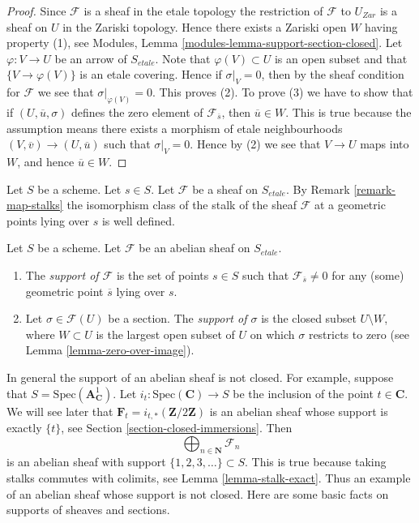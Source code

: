 \begin{proof}
Since $\mathcal{F}$ is a sheaf in the etale topology the restriction of
$\mathcal{F}$ to $U_{Zar}$ is a sheaf on $U$ in the Zariski topology.
Hence there exists a Zariski open $W$ having property (1), see
Modules, Lemma \ref{modules-lemma-support-section-closed}. Let
$\varphi : V \to U$ be an arrow of $S_{etale}$. Note that
$\varphi(V) \subset U$ is an open subset and that
$\{V \to \varphi(V)\}$ is an etale covering. Hence if
$\sigma|_V = 0$, then by the sheaf condition for $\mathcal{F}$ we
see that $\sigma|_{\varphi(V)} = 0$. This proves (2).
To prove (3) we have to show that if $(U, \overline{u}, \sigma)$
defines the zero element of $\mathcal{F}_{\overline{s}}$, then
$\overline{u} \in W$. This is true because the assumption means
there exists a morphism of etale neighbourhoods
$(V, \overline{v}) \to (U, \overline{u})$ such that
$\sigma|_V = 0$. Hence by (2) we see that $V \to U$ maps into $W$, and
hence $\overline{u} \in W$.
\end{proof}

\noindent
Let $S$ be a scheme. Let $s \in S$.
Let $\mathcal{F}$ be a sheaf on $S_{etale}$. By
Remark \ref{remark-map-stalks}
the isomorphism class of the stalk of the sheaf $\mathcal{F}$
at a geometric points lying over $s$ is well defined.

\begin{definition}
\label{definition-support}
Let $S$ be a scheme. Let $\mathcal{F}$ be an abelian sheaf on $S_{etale}$.
\begin{enumerate}
\item The {\it support of $\mathcal{F}$} is the set of
points $s \in S$ such that $\mathcal{F}_{\overline{s}} \not = 0$
for any (some) geometric point $\overline{s}$ lying over $s$.
\item Let $\sigma \in \mathcal{F}(U)$ be a section.
The {\it support of $\sigma$} is the closed subset $U \setminus W$, where
$W \subset U$ is the largest open subset of $U$ on which $\sigma$
restricts to zero (see
Lemma \ref{lemma-zero-over-image}).
\end{enumerate}
\end{definition}

\noindent
In general the support of an abelian sheaf is not closed.
For example, suppose that $S = \text{Spec}(\mathbf{A}^1_{\mathbf{C}})$.
Let $i_t : \text{Spec}(\mathbf{C}) \to S$ be the inclusion of the
point $t \in \mathbf{C}$.
We will see later that $\mathbf{F}_t = i_{t, *}(\mathbf{Z}/2\mathbf{Z})$
is an abelian sheaf whose support is exactly $\{t\}$, see
Section \ref{section-closed-immersions}.
Then
$$
\bigoplus\nolimits_{n \in \mathbf{N}} \mathcal{F}_n
$$
is an abelian sheaf with support $\{1, 2, 3, \ldots\} \subset S$.
This is true because taking stalks commutes with colimits, see
Lemma \ref{lemma-stalk-exact}.
Thus an example of an abelian sheaf whose support is not closed.
Here are some basic facts on supports of sheaves and sections.

